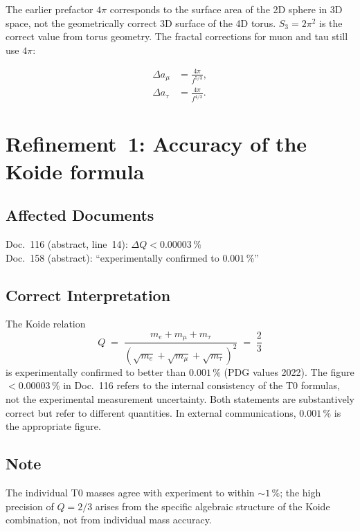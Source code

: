 The earlier prefactor $4\pi$ corresponds to the surface area of the 2D sphere
in 3D space, not the geometrically correct 3D surface of the 4D torus.
$S_3 = 2\pi^2$ is the correct value from torus geometry. The
fractal corrections for muon and tau still use $4\pi$:

\begin{align}
  \Delta a_\mu  &= \frac{4\pi}{f^{5/3}}, \tag{190.5}\\
  \Delta a_\tau &= \frac{4\pi}{f^{4/3}}. \tag{190.6}
\end{align}

\section{Refinement~1: Accuracy of the Koide formula}

\subsection*{Affected Documents}

Doc.~116 (abstract, line~14): $\Delta Q < 0.00003\,\%$ \\
Doc.~158 (abstract): \enquote{experimentally confirmed to $0.001\,\%$}

\subsection*{Correct Interpretation}

The Koide relation
\begin{equation}
  Q \;=\; \frac{m_e + m_\mu + m_\tau}
               {(\sqrt{m_e}+\sqrt{m_\mu}+\sqrt{m_\tau})^2}
  \;=\; \frac{2}{3}
  \tag{190.7}
\end{equation}
is experimentally confirmed to better than $0.001\,\%$
(PDG values 2022). The figure $< 0.00003\,\%$ in Doc.~116 refers
to the internal consistency of the T0 formulas, not the
experimental measurement uncertainty. Both statements are
substantively correct but refer to different quantities. In external
communications, $0.001\,\%$ is the appropriate figure.

\subsection*{Note}

The individual T0 masses agree with experiment to within $\sim 1\,\%$;
the high precision of $Q = 2/3$ arises from the specific
algebraic structure of the Koide combination, not from individual
mass accuracy.

